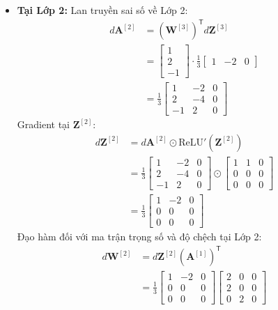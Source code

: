 \begin{itemize}
    \item \textbf{Tại Lớp 2:}
    Lan truyền sai số về Lớp 2:
    \begin{align*}
    d\mathbf{A}^{[2]} &= \left(\mathbf{W}^{[3]}\right)^{\mathsf{T}} d\mathbf{Z}^{[3]} \\
    &= \begin{bmatrix} 1 \\ 2 \\ -1 \end{bmatrix} \cdot \frac{1}{3}\begin{bmatrix} 1 & -2 & 0 \end{bmatrix} \\
    &= \frac{1}{3}\begin{bmatrix} 1 & -2 & 0 \\ 2 & -4 & 0 \\ -1 & 2 & 0 \end{bmatrix}
    \end{align*}
    Gradient tại $\mathbf{Z}^{[2]}$:
    \begin{align*}
    d\mathbf{Z}^{[2]} &= d\mathbf{A}^{[2]} \odot \text{ReLU}'\!\left(\mathbf{Z}^{[2]}\right) \\
    &= \frac{1}{3}\begin{bmatrix} 1 & -2 & 0 \\ 2 & -4 & 0 \\ -1 & 2 & 0 \end{bmatrix} \odot \begin{bmatrix} 1 & 1 & 0 \\ 0 & 0 & 0 \\ 0 & 0 & 0 \end{bmatrix} \\
    &= \frac{1}{3}\begin{bmatrix} 1 & -2 & 0 \\ 0 & 0 & 0 \\ 0 & 0 & 0 \end{bmatrix}
    \end{align*}
    Đạo hàm đối với ma trận trọng số và độ chệch tại Lớp 2:
    \begin{align*}
    d\mathbf{W}^{[2]} &= d\mathbf{Z}^{[2]}\left(\mathbf{A}^{[1]}\right)^{\mathsf{T}} \\
    &= \frac{1}{3}\begin{bmatrix} 1 & -2 & 0 \\ 0 & 0 & 0 \\ 0 & 0 & 0 \end{bmatrix}\begin{bmatrix} 2 & 0 & 0 \\ 2 & 0 & 0 \\ 0 & 2 & 0 \end{bmatrix} \\

\end{align*}
\end{itemize}
